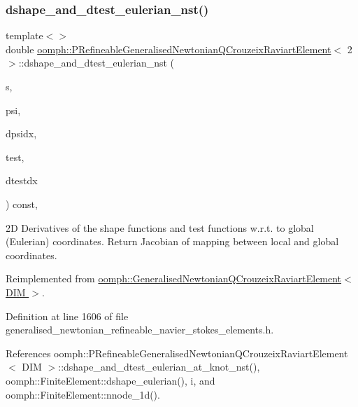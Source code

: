 \subsubsection{\texorpdfstring{dshape\+\_\+and\+\_\+dtest\+\_\+eulerian\+\_\+nst()}{dshape\_and\_dtest\_eulerian\_nst()}\hspace{0.1cm}{\footnotesize\ttfamily [2/3]}}
{\footnotesize\ttfamily template$<$$>$ \\
double \hyperlink{classoomph_1_1PRefineableGeneralisedNewtonianQCrouzeixRaviartElement}{oomph\+::\+P\+Refineable\+Generalised\+Newtonian\+Q\+Crouzeix\+Raviart\+Element}$<$ 2 $>$\+::dshape\+\_\+and\+\_\+dtest\+\_\+eulerian\+\_\+nst (\begin{DoxyParamCaption}\item[{const \hyperlink{classoomph_1_1Vector}{Vector}$<$ double $>$ \&}]{s,  }\item[{\hyperlink{classoomph_1_1Shape}{Shape} \&}]{psi,  }\item[{\hyperlink{classoomph_1_1DShape}{D\+Shape} \&}]{dpsidx,  }\item[{\hyperlink{classoomph_1_1Shape}{Shape} \&}]{test,  }\item[{\hyperlink{classoomph_1_1DShape}{D\+Shape} \&}]{dtestdx }\end{DoxyParamCaption}) const\hspace{0.3cm}{\ttfamily [inline]}, {\ttfamily [virtual]}}

2D Derivatives of the shape functions and test functions w.\+r.\+t. to global (Eulerian) coordinates. Return Jacobian of mapping between local and global coordinates. 

Reimplemented from \hyperlink{classoomph_1_1GeneralisedNewtonianQCrouzeixRaviartElement_a815dca7d5b556835865c7691e547bc37}{oomph\+::\+Generalised\+Newtonian\+Q\+Crouzeix\+Raviart\+Element$<$ D\+I\+M $>$}.



Definition at line 1606 of file generalised\+\_\+newtonian\+\_\+refineable\+\_\+navier\+\_\+stokes\+\_\+elements.\+h.



References oomph\+::\+P\+Refineable\+Generalised\+Newtonian\+Q\+Crouzeix\+Raviart\+Element$<$ D\+I\+M $>$\+::dshape\+\_\+and\+\_\+dtest\+\_\+eulerian\+\_\+at\+\_\+knot\+\_\+nst(), oomph\+::\+Finite\+Element\+::dshape\+\_\+eulerian(), i, and oomph\+::\+Finite\+Element\+::nnode\+\_\+1d().

\mbox{\label{classoomph_1_1PRefineableGeneralisedNewtonianQCrouzeixRaviartElement_a4d78303b555e3453b5dc92d25ce60c4c}} 

